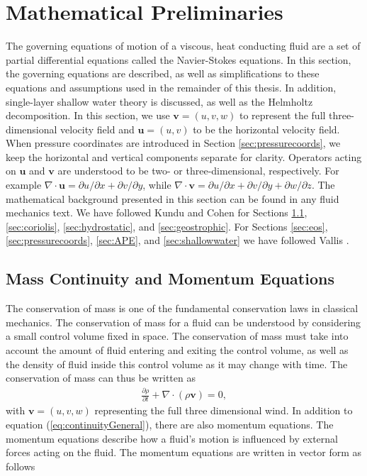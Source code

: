 \section{Mathematical Preliminaries}
\label{sec:preliminaries}
The governing equations of motion of a viscous, heat conducting fluid are a set of partial differential equations called the Navier-Stokes equations. In this section, the governing equations are described, as well as simplifications to these equations and assumptions used in the remainder of this thesis. In addition, single-layer shallow water theory is discussed, as well as the Helmholtz decomposition. In this section, we use $\mathbf{v} = (u,v,w)$ to represent the full three-dimensional velocity field and $\mathbf{u} = (u,v)$ to be the horizontal velocity field. When pressure coordinates are introduced in Section \ref{sec:pressurecoords}, we keep the horizontal and vertical components separate for clarity. Operators acting on $\mathbf{u}$ and $\mathbf{v}$ are understood to be two- or three-dimensional, respectively. For example $\nabla \cdot \mathbf{u} = \partial u/\partial x + \partial v/\partial y$, while $\nabla \cdot \mathbf{v} = \partial u/\partial x + \partial v/\partial y + \partial w/\partial z$. The mathematical background presented in this section can be found in any fluid mechanics text. We have followed Kundu and Cohen \cite{Kundu2002} for Sections \ref{sec:momentum}, \ref{sec:coriolis}, \ref{sec:hydrostatic}, and \ref{sec:geostrophic}. For Sections \ref{sec:eos}, \ref{sec:pressurecoords}, \ref{sec:APE}, and \ref{sec:shallowwater} we have followed Vallis \cite{Vallis2006}.

\subsection{Mass Continuity and Momentum Equations}
\label{sec:momentum}
The conservation of mass is one of the fundamental conservation laws in classical mechanics. The conservation of mass for a fluid can be understood by considering a small control volume fixed in space. The conservation of mass must take into account the amount of fluid entering and exiting the control volume, as well as the density of fluid inside this control volume as it may change with time. The conservation of mass can thus be written as
\begin{align}
\frac{\partial \rho}{\partial t} + \nabla \cdot (\rho \mathbf{v}) = 0 \label{eq:continuityGeneral},
\end{align} 
with $\mathbf{v} = (u,v,w)$ representing the full three dimensional wind. In addition to equation (\ref{eq:continuityGeneral}), there are also momentum equations. The momentum equations describe how a fluid's motion is influenced by external forces acting on the fluid. The momentum equations are written in vector form as follows

